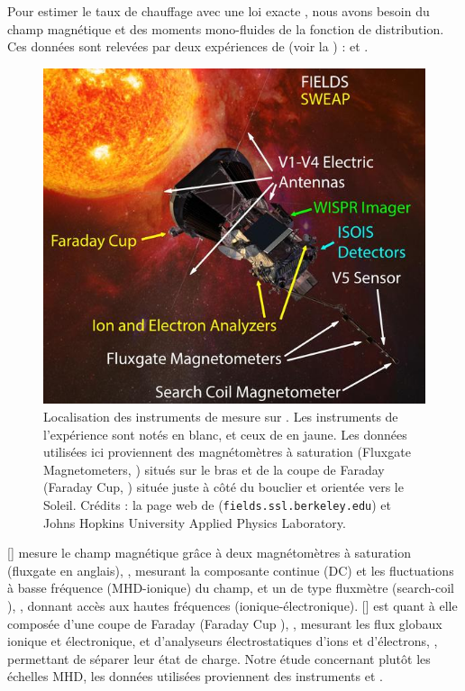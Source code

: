 Pour estimer le taux de chauffage avec une loi exacte , nous avons besoin du champ magnétique et des moments mono-fluides de la fonction de distribution. Ces données sont relevées par deux expériences de  (voir la ) :  et . 
\begin{figure}[!ht]
 \centering
\includegraphics[width=0.9\linewidth,trim=0cm 0cm 0cm 0cm, clip=false]{./Mainmatter/Part_1/images/PSP_All_Instruments}
\cprotect\caption{Localisation des instruments de mesure sur . Les instruments de l'expérience  sont notés en blanc, et ceux de  en jaune. Les données utilisées ici proviennent des magnétomètres à saturation (Fluxgate Magnetometers, ) situés sur le bras et de la coupe de Faraday (Faraday Cup, ) située juste à côté du bouclier et orientée vers le Soleil. Crédits : la page web de  (\verb|fields.ssl.berkeley.edu|) et Johns Hopkins University Applied Physics Laboratory.}
\label{fig:sonde_PSP}
\end{figure}
 
  [\cite{bale_fields_2016}] mesure le champ magnétique grâce à deux magnétomètres à saturation (\og fluxgate \fg{} en anglais), , mesurant la composante continue (DC) et les fluctuations à basse fréquence (MHD-ionique) du champ,  et un de type fluxmètre (\og search-coil \fg{}), , donnant accès aux hautes fréquences (ionique-électronique).  [\cite{kasper_solar_2016}] est quant à elle composée d'une coupe de Faraday (\og Faraday Cup \fg{}), , mesurant les flux globaux ionique et électronique, et d'analyseurs électrostatiques d'ions et d'électrons, , permettant de séparer leur état de charge. Notre étude concernant plutôt les échelles MHD, les données utilisées proviennent des instruments  et . 

